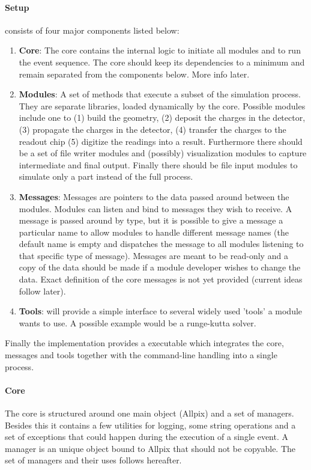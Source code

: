 \paragraph{Setup}
\apsq consists of four major components listed below:
\begin{enumerate}
\item \textbf{Core}: The core contains the internal logic to initiate all modules and to run the event sequence. The core should keep its dependencies to a minimum and remain separated from the components below. More info later.
\item \textbf{Modules}: A set of methods that execute a subset of the simulation process. They are separate libraries, loaded dynamically by the core. Possible modules include one to (1) build the geometry, (2) deposit the charges in the detector, (3) propagate the charges in the detector, (4) transfer the charges to the readout chip (5) digitize the readings into a result. Furthermore there should be a set of file writer modules and (possibly) visualization modules to capture intermediate and final output. Finally there should be file input modules to simulate only a part instead of the full process.
\item \textbf{Messages}: Messages are pointers to the data passed around between the modules. Modules can listen and bind to messages they wish to receive. A message is passed around by type, but it is possible to give a message a particular name to allow modules to handle different message names (the default name is empty and dispatches the message to all modules listening to that specific type of message). Messages are meant to be read-only and a copy of the data should be made if a module developer wishes to change the data. Exact definition of the core messages is not yet provided (current ideas follow later).
\item \textbf{Tools}: \apsq will provide a simple interface to several widely used 'tools' a module wants to use. A possible example would be a runge-kutta solver.
\end{enumerate}

Finally the implementation provides a executable which integrates the core, messages and tools together with the command-line handling into a single process.

\paragraph{Core}
The core is structured around one main object (Allpix) and a set of managers. Besides this it contains a few utilities for logging, some string operations and a set of exceptions that could happen during the execution of a single event. A manager is an unique object bound to Allpix that should not be copyable. The set of managers and their uses follows hereafter.

